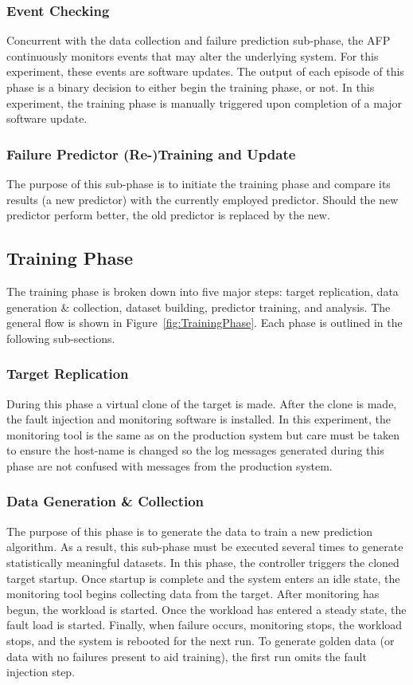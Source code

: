 \subsubsection{Event Checking}
Concurrent with the data collection and failure prediction sub-phase, the
\ac{AFP} continuously monitors events that may alter the underlying system.
For this experiment, these events are software updates.  The output of each
episode of this phase is a binary decision to either begin the training phase,
or not.  In this experiment, the training phase is manually triggered upon
completion of a major software update.

\subsubsection{Failure Predictor (Re-)Training and Update}
The purpose of this sub-phase is to initiate the training phase and compare its
results (a new predictor) with the currently employed predictor.  Should the
new predictor perform better, the old predictor is replaced by the new.

\subsection{Training Phase}
The training phase is broken down into five major steps:  target replication,
data generation \& collection, dataset building, predictor training, and
analysis.  The general flow is shown in Figure~\ref{fig:TrainingPhase}.  Each
phase is outlined in the following sub-sections.

\figTrainingPhase{4in}

\subsubsection{Target Replication}
During this phase a virtual clone of the target is made.  After the clone is
made, the fault injection and monitoring software is installed.  In this
experiment, the monitoring tool is the same as on the production system but
care must be taken to ensure the host-name is changed so the log messages
generated during this phase are not confused with messages from the production
system.

\subsubsection{Data Generation \& Collection}
The purpose of this phase is to generate the data to train a new prediction
algorithm.  As a result, this sub-phase must be executed several times to
generate statistically meaningful datasets.  In this phase, the controller
triggers the cloned target startup.  Once startup is complete and the system
enters an idle state, the monitoring tool begins collecting data from the
target.  After monitoring has begun, the workload is started.  Once the
workload has entered a steady state, the fault load is started.  Finally, when
failure occurs, monitoring stops, the workload stops, and the system is
rebooted for the next run.  To generate golden data (or data with no failures
present to aid training), the first run omits the fault injection step.

